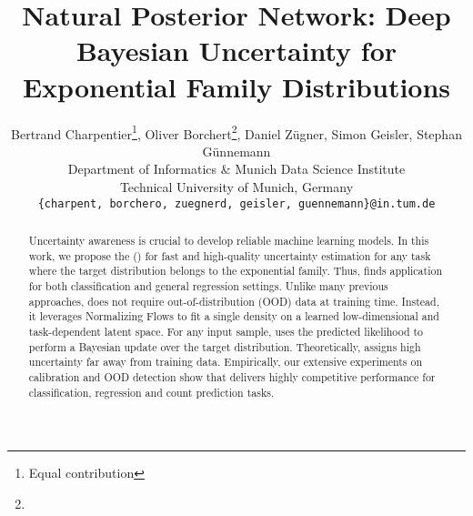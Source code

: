 \documentclass{article}
\title{Natural Posterior Network: Deep Bayesian Uncertainty for Exponential Family Distributions}
\author{%
   Bertrand Charpentier\thanks{Equal contribution}, Oliver Borchert\footnote[1]{}, Daniel Z\"ugner, Simon Geisler, Stephan G\"unnemann\\
   Department of Informatics \& Munich Data Science Institute\\
   Technical University of Munich, Germany\\
   \texttt{\{charpent, borchero, zuegnerd, geisler, guennemann\}@in.tum.de} \\
}
\begin{document}
\maketitle

\begin{abstract}

    Uncertainty awareness is crucial to develop reliable machine learning models. In this work, we propose the \ours{} (\oursacro{}) for fast and high-quality uncertainty estimation for any task where the target distribution belongs to the exponential family. Thus, \oursacro{} finds application for both classification and general regression settings. Unlike many previous approaches, \oursacro{} does not require out-of-distribution (OOD) data at training time. Instead, it leverages Normalizing Flows to fit a single density on a learned low-dimensional and task-dependent latent space. For any input sample, \oursacro{} uses the predicted likelihood to perform a Bayesian update over the target distribution. Theoretically, \oursacro{} assigns high uncertainty far away from training data. Empirically, our extensive experiments on calibration and OOD detection show that \oursacro{} delivers highly competitive performance for classification, regression and count prediction tasks.
    
\end{abstract}






\clearpage






\newpage

%


\appendix

\end{document}
